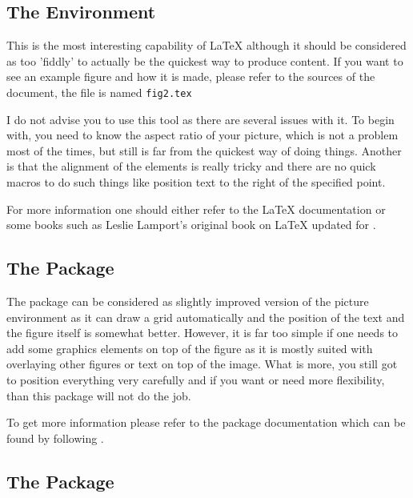 \documentclass[
]{scrartcl}
\begin{document}
%

%
\subsection{The  Environment}

%
This is the most interesting capability of \LaTeX{} although it should be
    considered as too 'fiddly' to actually be the quickest way to produce
    content.
%
If you want to see an example figure and how it is made, please refer to the
    sources of the document, the file is named \texttt{fig2.tex}

%
I do not advise you to use this tool as there are several issues with it.
%
To begin with, you need to know the aspect ratio of your picture, which is not a
    problem most of the times, but still is far from the quickest way of doing
    things.
%
Another is that the alignment of the elements is really tricky and there are no
    quick macros to do such things like position text to the right of the
    specified point.

%
For more information one should either refer to the \LaTeX{} documentation or
    some books such as Leslie Lamport's original book on \LaTeX{} updated for
    \LaTeXe{}.

%
\subsection{The  Package}

%
The  package can be considered as slightly improved version of the
    picture environment as it can draw a grid automatically and the position of
    the text and the figure itself is somewhat better.
%
However, it is far too simple if one needs to add some graphics elements on top
    of the figure as it is mostly suited with overlaying other figures or text
    on top of the image.
%
What is more, you still got to position everything very carefully and if you
    want or need more flexibility, than this package will not do the job.

%
To get more information please refer to the package documentation which can be
    found by following .

%
\subsection{The  Package}
\end{document}
